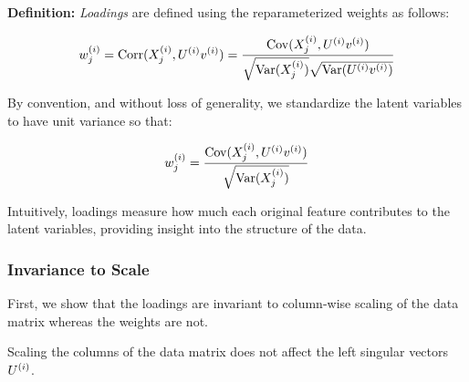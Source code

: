 \textbf{Definition:} \textit{Loadings} are defined using the reparameterized weights as follows:

\begin{align}
    w^{(i)}_j = \operatorname{Corr}(X^{(i)}_j, U^{(i)}v^{(i)}) = \frac{\mathrm{Cov}(X^{(i)}_j, U^{(i)}v^{(i)})}{\sqrt{\mathrm{Var}(X^{(i)}_j)}\sqrt{\mathrm{Var}(U^{(i)}v^{(i)})}} \label{eq:loading_def}
\end{align}

By convention, and without loss of generality, we standardize the latent variables to have unit variance so that:

\begin{align}
    w^{(i)}_j = \frac{\mathrm{Cov}(X^{(i)}_j, U^{(i)}v^{(i)})}{\sqrt{\mathrm{Var}(X^{(i)}_j)}} \label{eq:standardized_loading}
\end{align}

Intuitively, \gls{loadings} measure how much each original feature contributes to the latent variables, providing insight into the structure of the data.

\subsubsection{Invariance to Scale}\label{subsubsec:invariance-to-scale}

First, we show that the \gls{loadings} are invariant to column-wise scaling of the data matrix whereas the weights are not.

\begin{lemma}
    Scaling the columns of the data matrix does not affect the left singular vectors $U^{(i)}$.
\end{lemma}

